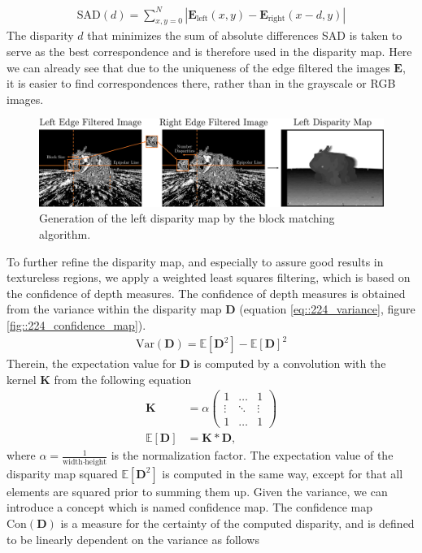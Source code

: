 \begin{align}
	\text{SAD}(d) = \sum_{x,y=0}^N |\bm{E}_\text{left}(x,y) - \bm{E}_\text{right}(x-d,y)|
	\label{eq::224_sad}
\end{align}
The disparity $d$ that minimizes the sum of absolute differences SAD is taken to serve as the best correspondence and is therefore used in the disparity map.  Here we can already see that due to the uniqueness of the edge filtered the images $\bm{E}$, it is easier to find correspondences there, rather than in the grayscale or RGB images.
\begin{figure}[h!]
	\centering
	\includegraphics[scale=.28]{chapters/02_background/img/left_disparity_map.png}
	\caption{Generation of the left disparity map by the block matching algorithm.}
	\label{fig::224_left_disparity_map}
\end{figure}
To further refine the disparity map, and especially to assure good results in textureless  regions, we apply a weighted least squares filtering, which is based on the confidence of depth measures. The confidence of depth measures is obtained from the variance within the disparity map $\bm{D}$ (equation \ref{eq::224_variance}, figure \ref{fig::224_confidence_map}).
\begin{align}
	 \text{Var}(\bm{D}) = \mathbb{E}\left[\bm{D}^2\right] - \mathbb{E}\left[\bm{D}\right]^2
	\label{eq::224_variance}
\end{align} 
Therein, the expectation value for $\bm{D}$ is computed by a convolution with the kernel $\bm{K}$ from the following equation
\begin{align}
	\bm{K} &= \alpha
	\begin{pmatrix}
	1 & \dots & 1 \\
	\vdots & \ddots & \vdots \\
	1 & \dots & 1
	\end{pmatrix} \\
	\mathbb{E}\left[\bm{D}\right] &= \bm{K}*\bm{D},
	\label{eq::224_kernel}
\end{align}
where $\alpha = \frac{1}{\text{width}\cdot\text{height}}$ is the normalization factor. The expectation value of the disparity map squared $\mathbb{E}\left[\bm{D}^2\right]$ is computed in the same way, except for that all elements are squared prior to summing them up. Given the variance, we can introduce a concept which is named confidence map. The confidence map $\text{Con}(\bm{D})$ is a measure for the certainty of the computed disparity, and is defined to be linearly dependent on the variance as follows
